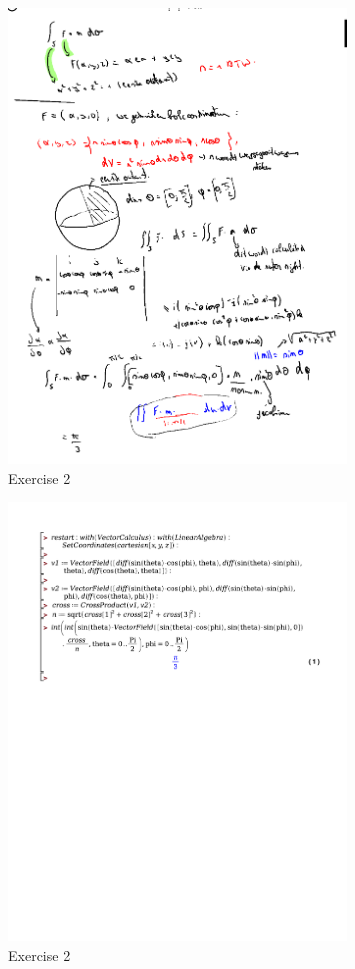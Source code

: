 \documentclass[a4paper]{report}
\begin{document}
\begin{figure}[H]
	\centering
	\includegraphics[width=0.8\textwidth]{assets/wc_7_ex_2.png}
	\caption{Exercise 2}
	\label{fig:wc_7_ex_2}
\end{figure}

\begin{figure}[H]
	\centering
	\includegraphics[width=0.8\textwidth]{exercises/wc_7_ex_2.pdf}
	\caption{Exercise 2}
	\label{fig:wc_7_ex_2_maple}
\end{figure}
\end{document}
